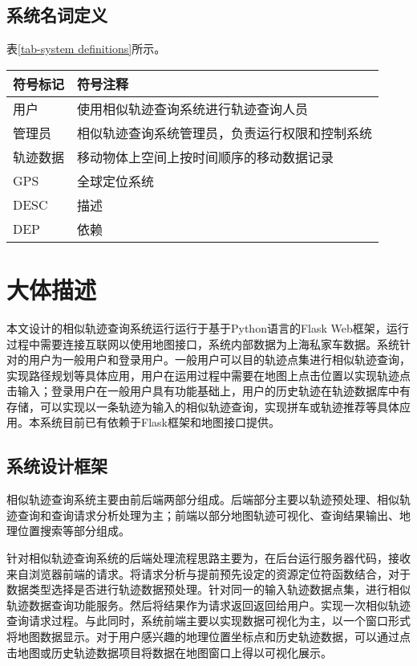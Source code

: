 \subsection{系统名词定义}
\label{subsec:definitions}
表\ref{tab-system definitions}所示。
\begin{table}[!htpb]
  	\centering
		\begin{tabular}{ |p{3cm}||p{9cm}|  }
		\hline
		符号标记 & 符号注释 \\
		\hline
		用户 & 使用相似轨迹查询系统进行轨迹查询人员 \\
		\hline
		管理员 & 相似轨迹查询系统管理员，负责运行权限和控制系统 \\
		\hline
		轨迹数据 & 移动物体上空间上按时间顺序的移动数据记录 \\
		\hline
		GPS & 全球定位系统 \\
		\hline
		DESC & 描述 \\
		\hline
		DEP & 依赖 \\
		\hline
		\end{tabular}
\end{table}

\section{大体描述}
\label{sec:overall description}
本文设计的相似轨迹查询系统运行运行于基于Python语言的Flask Web框架，运行过程中需要连接互联网以使用地图接口，系统内部数据为上海私家车数据。系统针对的用户为一般用户和登录用户。一般用户可以目的轨迹点集进行相似轨迹查询，实现路径规划等具体应用，用户在运用过程中需要在地图上点击位置以实现轨迹点击输入；登录用户在一般用户具有功能基础上，用户的历史轨迹在轨迹数据库中有存储，可以实现以一条轨迹为输入的相似轨迹查询，实现拼车或轨迹推荐等具体应用。本系统目前已有依赖于Flask框架和地图接口提供。

\subsection{系统设计框架}
\label{subsec:product perspective}
相似轨迹查询系统主要由前后端两部分组成。后端部分主要以轨迹预处理、相似轨迹查询和查询请求分析处理为主；前端以部分地图轨迹可视化、查询结果输出、地理位置搜索等部分组成。

针对相似轨迹查询系统的后端处理流程思路主要为，在后台运行服务器代码，接收来自浏览器前端的请求。将请求分析与提前预先设定的资源定位符函数结合，对于数据类型选择是否进行轨迹数据预处理。针对同一的输入轨迹数据点集，进行相似轨迹数据查询功能服务。然后将结果作为请求返回返回给用户。实现一次相似轨迹查询请求过程。与此同时，系统前端主要以实现数据可视化为主，以一个窗口形式将地图数据显示。对于用户感兴趣的地理位置坐标点和历史轨迹数据，可以通过点击地图或历史轨迹数据项目将数据在地图窗口上得以可视化展示。

